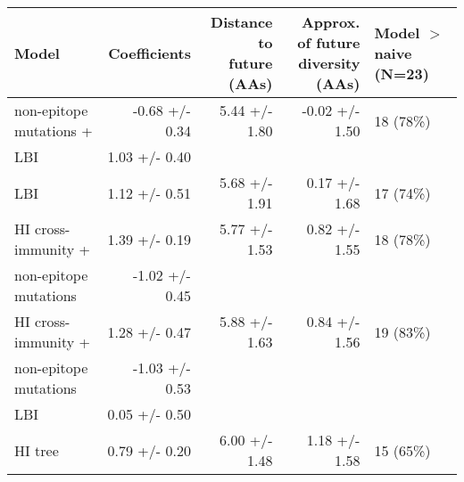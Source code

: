 \begin{tabular*}{1.0\textwidth}{lrrrl}
\toprule
                             Model &    Coefficients & \makecell{Distance to \\ future (AAs)} & \makecell{Approx. of future \\ diversity (AAs)} & \makecell[l]{Model $>$ naive \\ (N=23)} \\
\midrule
           non-epitope mutations + &  -0.68 +/- 0.34 &                          5.44 +/- 1.80 &                                  -0.02 +/- 1.50 &                               18 (78\%) \\
                   \hspace{3mm}LBI &   1.03 +/- 0.40 &                                        &                                                 &                                         \\
                               LBI &   1.12 +/- 0.51 &                          5.68 +/- 1.91 &                                   0.17 +/- 1.68 &                               17 (74\%) \\
               HI cross-immunity + &   1.39 +/- 0.19 &                          5.77 +/- 1.53 &                                   0.82 +/- 1.55 &                               18 (78\%) \\
 \hspace{3mm}non-epitope mutations &  -1.02 +/- 0.45 &                                        &                                                 &                                         \\
               HI cross-immunity + &   1.28 +/- 0.47 &                          5.88 +/- 1.63 &                                   0.84 +/- 1.56 &                               19 (83\%) \\
 \hspace{3mm}non-epitope mutations &  -1.03 +/- 0.53 &                                        &                                                 &                                         \\
                   \hspace{3mm}LBI &   0.05 +/- 0.50 &                                        &                                                 &                                         \\
                           HI tree &   0.79 +/- 0.20 &                          6.00 +/- 1.48 &                                   1.18 +/- 1.58 &                               15 (65\%) \\

\end{tabular*}
